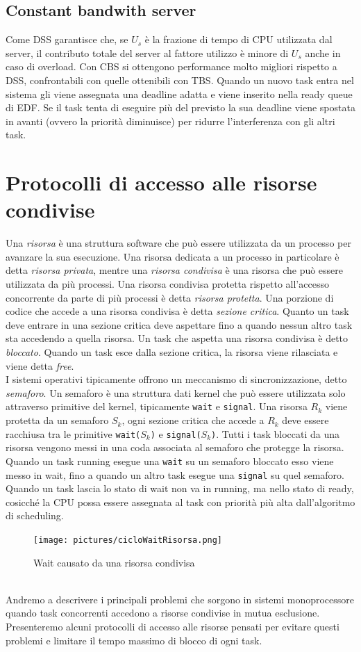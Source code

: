 \documentclass[12pt,openany,onesided]{book}
\begin{document}
\section{Constant bandwith server}
\label{sec:constantBandwidthServer}
Come DSS garantisce che, se $U_s$ è la frazione di tempo di CPU utilizzata dal server, il contributo totale del server al fattore utilizzo è minore di $U_s$ anche in caso di overload.
Con CBS si ottengono performance molto migliori rispetto a DSS, confrontabili con quelle ottenibili con TBS.
Quando un nuovo task entra nel sistema gli viene assegnata una deadline adatta e viene inserito nella ready queue di EDF.
Se il task tenta di eseguire più del previsto la sua deadline viene spostata in avanti (ovvero la priorità diminuisce) per ridurre l'interferenza con gli altri task.
\chapter{Protocolli di accesso alle risorse condivise}
Una \textit{risorsa} è una struttura software che può essere utilizzata da un processo per avanzare la sua esecuzione.
Una risorsa dedicata a un processo in particolare è detta \textit{risorsa privata}, mentre una \textit{risorsa condivisa} è una risorsa che può essere utilizzata da più processi.
Una risorsa condivisa protetta rispetto all'accesso concorrente da parte di più processi è detta \textit{risorsa protetta}.
Una porzione di codice che accede a una risorsa condivisa è detta \textit{sezione critica}.
Quanto un task deve entrare in una sezione critica deve aspettare fino a quando nessun altro task sta accedendo a quella risorsa.
Un task che aspetta una risorsa condivisa è detto \textit{bloccato}.
Quando un task esce dalla sezione critica, la risorsa viene rilasciata e viene detta \textit{free}.
\\
I sistemi operativi tipicamente offrono un meccanismo di sincronizzazione, detto \textit{semaforo}.
Un semaforo è una struttura dati kernel che può essere utilizzata solo attraverso primitive del kernel, tipicamente \texttt{wait} e \texttt{signal}.
Una risorsa $R_k$ viene protetta da un semaforo $S_k$, ogni sezione critica che accede a $R_k$ deve essere racchiusa tra le primitive \texttt{wait($S_k$)} e \texttt{signal($S_k$)}.
Tutti i task bloccati da una risorsa vengono messi in una coda associata al semaforo che protegge la risorsa.
Quando un task running esegue una \texttt{wait} su un semaforo bloccato esso viene messo in wait, fino a quando un altro task esegue una \texttt{signal} su quel semaforo.
Quando un task lascia lo stato di wait non va in running, ma nello stato di ready, cosicché la CPU possa essere assegnata al task con priorità più alta dall'algoritmo di scheduling.
\begin{figure}[h]
    \centering
    \texttt{[image: pictures/cicloWaitRisorsa.png]}
    \caption{Wait causato da una risorsa condivisa}
\end{figure}
\\
Andremo a descrivere i principali problemi che sorgono in sistemi monoprocessore quando task concorrenti accedono a risorse condivise in mutua esclusione.
Presenteremo alcuni protocolli di accesso alle risorse pensati per evitare questi problemi e limitare il tempo massimo di blocco di ogni task.
\end{document}
